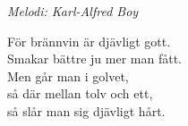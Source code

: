 {\footnotesize\textit{Melodi: Karl-Alfred Boy}}\par
\vspace{10pt}
För brännvin är djävligt gott.\\
Smakar bättre ju mer man fått.\\
Men går man i golvet,\\
så där mellan tolv och ett,\\
så slår man sig djävligt hårt.

